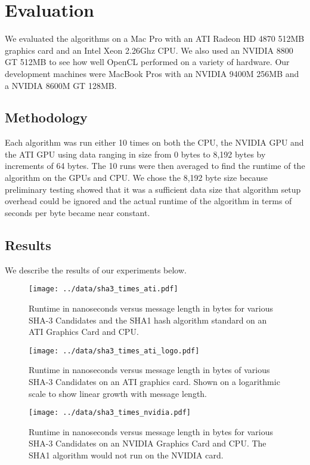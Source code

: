 \section*{Evaluation}
We evaluated the algorithms on a Mac Pro with an ATI Radeon HD 4870 512MB graphics card and an Intel Xeon 2.26Ghz CPU.
We also used an NVIDIA 8800 GT 512MB to see how well OpenCL performed on a variety of hardware.
Our development machines were MacBook Pros with an NVIDIA 9400M 256MB and a NVIDIA 8600M GT 128MB.

\subsection*{Methodology}
Each algorithm was run either 10 times on both the CPU, the NVIDIA GPU and the ATI GPU using data ranging in size from 0 bytes to 8,192 bytes by increments of 64 bytes.
The 10 runs were then averaged to find the runtime of the algorithm on the GPUs and CPU.
We chose the 8,192 byte size because preliminary testing showed that it was a sufficient data size that algorithm setup overhead could be ignored and the actual runtime of the algorithm in terms of seconds per byte became near constant.

\subsection*{Results}

We describe the results of our experiments below.

\begin{figure}[h!tp]
\texttt{[image: ../data/sha3\_times\_ati.pdf]}
\caption{Runtime in nanoseconds versus message length in bytes for various SHA-3 Candidates and the SHA1 hash algorithm standard on an ATI Graphics Card and CPU.}\label{fig:sha3_times_ati}
\end{figure}

\begin{figure}[h!tp]
\texttt{[image: ../data/sha3\_times\_ati\_logo.pdf]}
\caption{Runtime in nanoseconds versus message length in bytes of various SHA-3 Candidates on an ATI graphics card. Shown on a logarithmic scale to show linear growth with message length.}\label{fig:ati_logo}
\end{figure}

\begin{figure}[h!tp]
\texttt{[image: ../data/sha3\_times\_nvidia.pdf]}
\caption{Runtime in nanoseconds versus message length in bytes for various SHA-3 Candidates on an NVIDIA Graphics Card and CPU. The SHA1 algorithm would not run on the NVIDIA card.}\label{fig:sha3_times_nvidia}
\end{figure}

